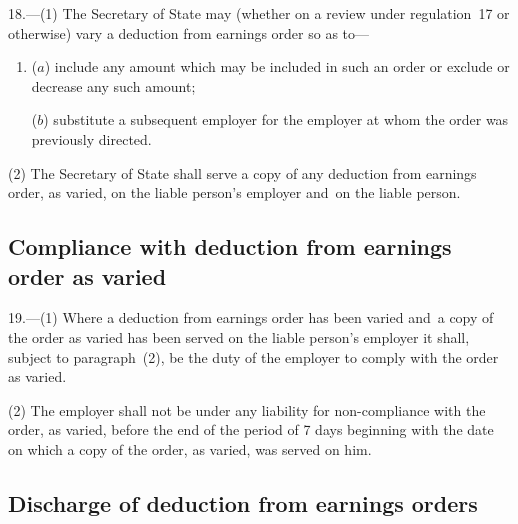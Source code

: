 \documentclass[12pt,a4paper]{article}
\begin{document}
18.—(1) The Secretary of State may (whether on a review under regulation~17 or otherwise) vary a deduction from earnings order so as to—
\begin{enumerate}\item[]
($a$) include any amount which may be included in such an order or exclude or decrease any such amount;

($b$) substitute a subsequent employer for the employer at whom the order was previously directed.
\end{enumerate}

(2) The Secretary of State shall serve a copy of any deduction from earnings order, as varied, on the liable person’s employer and~on the liable person.

\subsection[19. Compliance with deduction from earnings order as varied]{Compliance with deduction from earnings order as varied}

19.—(1) Where a deduction from earnings order has been varied and~a copy of the order as varied has been served on the liable person’s employer it shall, subject to paragraph~(2), be the duty of the employer to comply with the order as varied.

(2) The employer shall not be under any liability for non-compliance with the order, as varied, before the end of the period of 7 days beginning with the date on which a copy of the order, as varied, was served on him.

\subsection[20. Discharge of deduction from earnings orders]{Discharge of deduction from earnings orders}
\end{document}
